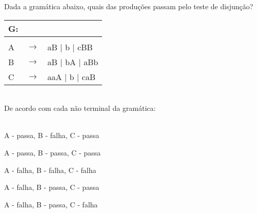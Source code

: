 \question[10] 

Dada a gramática abaixo, quais das produções passam pelo teste de disjunção?\\
\begin{tabular}{|l c l}
	G: & & \\
	\hline \\
	A & $\rightarrow$ & aB | b | cBB \\
    B & $\rightarrow$ & aB | bA | aBb \\
	C & $\rightarrow$ & aaA | b | caB \\
\end{tabular}
\\
De acordo com cada não terminal da gramática:\\
\\
\begin{choices}
\item A - passa, B - falha, C - passa %
\item A - passa, B - passa, C - passa
\item A - falha, B - falha, C - falha
\item A - falha, B - passa, C - passa
\item A - falha, B - passa, C - falha
\end{choices}
\answerline
